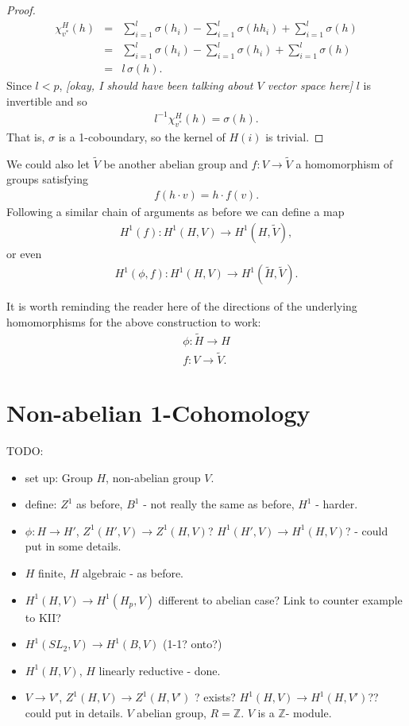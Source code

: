 \begin{proof}
\begin{eqnarray*}
	\chi_{v^*}^H(h) &=& \sum_{i = 1}^l\sigma(h_i) - \sum_{i = 1}^l \sigma(hh_i) +\sum_{i = 1}^l \sigma(h)\\
	&=& \sum_{i = 1}^l\sigma(h_i) - \sum_{i = 1}^l \sigma(h_i) +\sum_{i = 1}^l \sigma(h) \\
	&=& l\, \sigma(h).
\end{eqnarray*}
Since $l<p$, \emph{[okay, I should have been talking about $V$ vector space here]} $l$ is invertible and so
\begin{eqnarray*}
	l^{-1}\chi_{v^*}^H(h) = \sigma(h).
\end{eqnarray*}
That is, $\sigma$ is a 1-coboundary, so the kernel of $H(i)$ is trivial.
\end{proof}

We could also let $\tilde{V}$ be another abelian group and $f:V\rightarrow\tilde{V}$ a homomorphism of groups satisfying
\begin{eqnarray*}
	f ( h\cdot v) = h\cdot f(v).
\end{eqnarray*}
Following a similar chain of arguments as before we can define a map
\begin{eqnarray*}
	H^1(f):H^1(H, V)\rightarrow H^1(H, \tilde{V}),
\end{eqnarray*}
or even	
\begin{eqnarray*}
	H^1(\phi, f):H^1(H, V)\rightarrow H^1(\tilde{H}, \tilde{V}).
\end{eqnarray*}

It is worth reminding the reader here of the directions of the underlying homomorphisms for the above construction to work:
\begin{eqnarray*}
	\phi:\tilde{H} \rightarrow H \\
	f: V \rightarrow \tilde{V}.
\end{eqnarray*}

\section{Non-abelian 1-Cohomology}
TODO:
	\begin{itemize}
	\item set up: Group $H$, non-abelian group $V$.
	\item define: $Z^1$ as before, $B^1$ - not really the same as before, $H^1$ - harder.
	\item $\phi:H\rightarrow H'$, $Z^1(H', V)\rightarrow Z^1(H, V)$?
	$H^1(H', V)\rightarrow H^1(H, V)$?
	- could put in some details.
	\item $H$ finite, $H$ algebraic - as before.
	\item $H^1(H, V) \rightarrow H^1(H_p, V)$ different to abelian case? Link to counter example to KII?
	\item $H^1(SL_2, V) \rightarrow H^1(B, V)$ (1-1? onto?)
	\item $H^1(H, V)$, $H$ linearly reductive - done.
	\item $V\rightarrow V'$, $Z^1(H, V) \rightarrow Z^1(H, V')$ ? exists?
	$H^1(H, V) \rightarrow H^1(H, V')$??
	could put in details.
	$V$ abelian group, $R=\mathbb{Z}$. $V$ is a $\mathbb{Z}$- module.
	\end{itemize}
	
